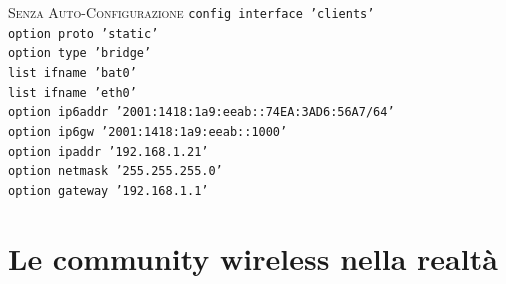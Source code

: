 \documentclass{beamer}
\begin{document}
{\begin{frame}
\begin{alertblock}{\textsc{Senza Auto-Configurazione}}
\texttt{\tiny config interface 'clients'\\
\hspace{0.5cm}	option proto 'static'\\
\hspace{0.5cm}	option type 'bridge'\\
\hspace{0.5cm}	list ifname 'bat0'\\
\hspace{0.5cm}	list ifname 'eth0'\\
\hspace{0.5cm}	option ip6addr '2001:1418:1a9:eeab::74EA:3AD6:56A7/64'\\
\hspace{0.5cm}	option ip6gw '2001:1418:1a9:eeab::1000'\\
\hspace{0.5cm}	option ipaddr '192.168.1.21'\\
\hspace{0.5cm}	option netmask '255.255.255.0'\\
\hspace{0.5cm}	option gateway '192.168.1.1'\\}
\end{alertblock}
\end{frame}}

 

\section{Le community wireless nella realtà}
\end{document}
